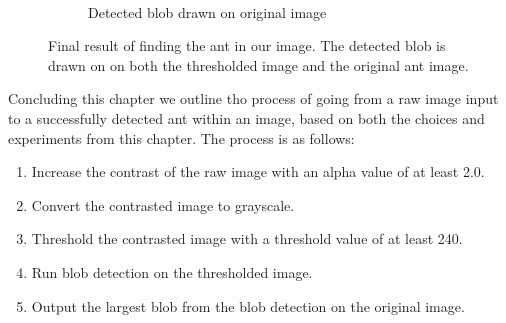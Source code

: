 \begin{figure}
\begin{subfigure}[b]{0.45\textwidth}
                \caption{\mbox{}\\Detected blob drawn on original image}
        \end{subfigure}
		\caption{Final result of finding the ant in our image. The detected blob is drawn on on both the thresholded image and the original ant image.}
		\label{fig:finalResult}
\end{figure}

Concluding this chapter we outline tho process of going from a raw image input to a successfully detected ant within an image, based on both the choices and experiments from this chapter. The process is as follows:

\begin{enumerate}
    \item Increase the contrast of the raw image with an alpha value of at least 2.0.
    \item Convert the contrasted image to grayscale.
    \item Threshold the contrasted image with a threshold value of at least 240.
    \item Run blob detection on the thresholded image.
    \item Output the largest blob from the blob detection on the original image.
\end{enumerate}

